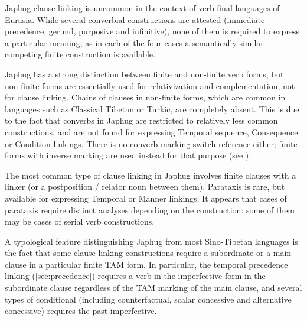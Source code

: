 \documentclass[oldfontcommands,oneside,a4paper,11pt]{article}
\newcommand{\refb}[1]{(\ref{#1})}
\begin{document}
Japhug clause linking is uncommon in the context of verb final languages of Eurasia. While  several converbial constructions are attested (immediate precedence, gerund, purposive and infinitive), none of them is required to express a particular meaning, as in each of the four cases a semantically similar competing finite construction is available.

Japhug has a strong distinction between finite and non-finite verb forms, but non-finite forms are essentially used for relativization and complementation, not for clause linking. Chains of clauses in non-finite forms, which are common in languages such as Classical Tibetan or Turkic, are completely absent. This is due to the fact that converbs in Japhug are restricted to   relatively less common constructions, and are not found for expressing  Temporal sequence, Consequence or Condition linkings. There is no converb marking switch reference either; finite forms with inverse marking are used instead for that purpose (see \citealt{jacques10inverse}).

The most common type of clause linking in Japhug involves finite clauses with  a linker (or a postposition / relator noun between them). Parataxis is rare, but available for expressing Temporal  or Manner linkings. It appears that cases of parataxis require distinct analyses depending on the construction: some of them may be cases of serial verb constructions.

A typological feature distinguishing Japhug from most Sino-Tibetan languages  is the fact that some clause linking constructions require a subordinate or a main clause in a particular finite TAM form. In particular, the temporal precedence linking \refb{sec:precedence} requires a verb in the imperfective form in the subordinate clause regardless of the TAM marking of the main clause, and several types of conditional (including counterfactual, scalar  concessive and alternative concessive) requires the past imperfective.




\end{document}
